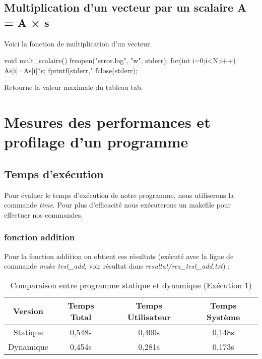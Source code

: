 \documentclass{rapport}
\begin{document}
      \subsection{Multiplication d’un vecteur par un scalaire A = A × s}
        Voici la fonction de multiplication d'un vecteur.
        \begin{algorithm}
        \begin{C}
void mult_scalaire(){
    freopen("error.log", "w", stderr);
    for(int i=0;i<N;i++){
        As[i]=As[i]*s;
        fprintf(stderr,"%
    }
    fclose(stderr);
}
        \end{C}
        \caption[Algo en C]{Retourne la valeur maximale du tableau tab.\label{ag:algoc}}
      \end{algorithm}
    
    \section{Mesures des performances et profilage d’un programme}
    \subsection{Temps d'exécution}
      Pour évaluer le temps d'exécution de notre programme, nous utiliserons la commande \textit{time}.
      Pour plus d'efficacité nous exécuterons un makefile pour effectuer nos commandes.
      
    \subsubsection{fonction addition}
      Pour la fonction addition on obtient ces résultats (exécuté avec la ligne de commande \textit{make test\_add}, voir résultat dans \textit{resultat/res\_test\_add.txt}) :
     
    \begin{table}[h!]
    \centering
    \begin{tabular}{|c|c|c|c|}
        \hline
        Version & Temps Total & Temps Utilisateur & Temps Système \\
        \hline
        Statique & 0,548s & 0,400s & 0,148s \\
        \hline
        Dynamique & 0,454s & 0,281s & 0,173s \\
        \hline
    \end{tabular}
    \caption{Comparaison entre programme statique et dynamique (Exécution 1)}
    \label{tab:graph_characteristics_1}
\end{table}
\end{document}
